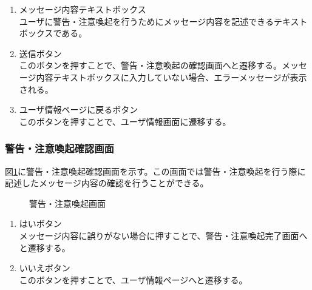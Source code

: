 \documentclass[a4j]{jarticle}
\begin{document}
\begin{enumerate}
  \renewcommand{\labelenumi}{\textcircled{\scriptsize \theenumi}}

\item メッセージ内容テキストボックス\\
ユーザに警告・注意喚起を行うためにメッセージ内容を記述できるテキストボックスである。
\item 送信ボタン\\
  このボタンを押すことで、警告・注意喚起の確認画面へと遷移する。メッセージ内容テキストボックスに入力していない場合、エラーメッセージが表示される。
\item ユーザ情報ページに戻るボタン\\
  このボタンを押すことで、ユーザ情報画面に遷移する。
\end{enumerate}

\subsubsection{警告・注意喚起確認画面}
図\ref{fig:warning_confirm}に警告・注意喚起確認画面を示す。この画面では警告・注意喚起を行う際に記述したメッセージ内容の確認を行うことができる。
\begin{figure}[H]
\centering
{}
\caption{警告・注意喚起画面}
\label{fig:warning_confirm}
\end{figure}

\begin{enumerate}
  \renewcommand{\labelenumi}{\textcircled{\scriptsize \theenumi}}

\item はいボタン\\
メッセージ内容に誤りがない場合に押すことで、警告・注意喚起完了画面へと遷移する。
\item いいえボタン\\
このボタンを押すことで、ユーザ情報ページへと遷移する。
\end{enumerate}
\end{document}
